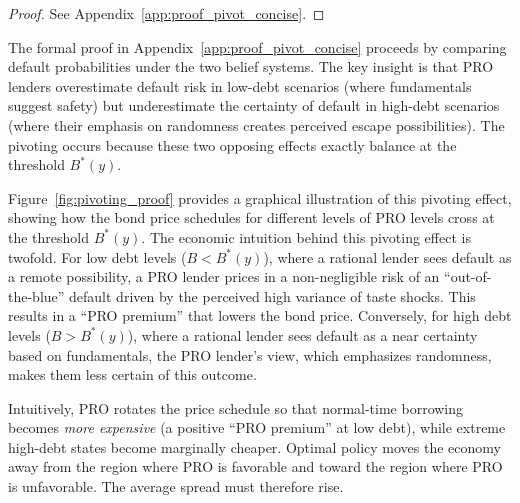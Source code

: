 \documentclass[12pt]{article}
\theoremstyle{plain}
\begin{document}
\begin{proof}
	See Appendix~\ref{app:proof_pivot_concise}.
\end{proof}

The formal proof in Appendix~\ref{app:proof_pivot_concise} proceeds by
comparing default probabilities under the two belief systems. The key insight
is that PRO lenders overestimate default risk in low-debt scenarios (where
fundamentals suggest safety) but underestimate the certainty of default in
high-debt scenarios (where their emphasis on randomness creates perceived
escape possibilities). The pivoting occurs because these two opposing effects
exactly balance at the threshold $B^*(y)$.

Figure~\ref{fig:pivoting_proof} provides a graphical illustration of this
pivoting effect, showing how the bond price schedules for different levels of
PRO levels cross at the threshold $B^*(y)$. The economic intuition behind this
pivoting effect is twofold. For low debt levels ($B<B^*(y)$), where a rational
lender sees default as a remote possibility, a PRO lender prices in a
non-negligible risk of an ``out-of-the-blue'' default driven by the perceived
high variance of taste shocks. This results in a ``PRO premium'' that lowers
the bond price. Conversely, for high debt levels ($B>B^*(y)$), where a rational
lender sees default as a near certainty based on fundamentals, the PRO lender's
view, which emphasizes randomness, makes them less certain of this outcome.

Intuitively, PRO rotates the price schedule so that normal-time borrowing
becomes \emph{more expensive} (a positive ``PRO premium'' at low debt), while
extreme high-debt states become marginally cheaper. Optimal policy moves the
economy away from the region where PRO is favorable and toward the region where
PRO is unfavorable. The average spread must therefore rise.
\end{document}
